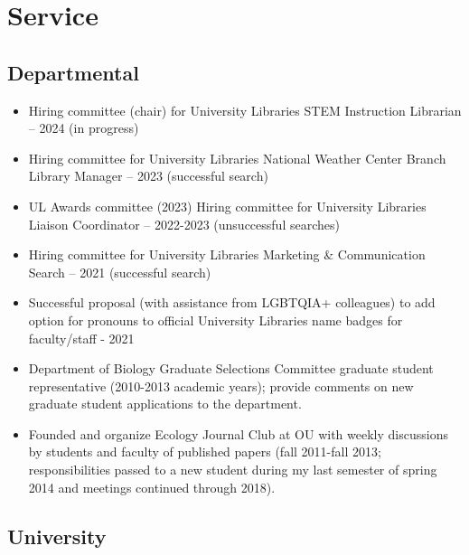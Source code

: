 \documentclass[
  letterpaper,
  DIV=11,
  numbers=noendperiod,
  oneside]{scrreprt}
\providecommand{\tightlist}{%
  \setlength{\itemsep}{0pt}\setlength{\parskip}{0pt}}\usepackage{longtable,booktabs,array}
\begin{document}

\chapter{Service}\label{service}

\section{Departmental}\label{departmental}

\begin{itemize}
\tightlist
\item
  Hiring committee (chair) for University Libraries STEM Instruction
  Librarian -- 2024 (in progress)
\item
  Hiring committee for University Libraries National Weather Center
  Branch Library Manager -- 2023 (successful search)
\item
  UL Awards committee (2023) Hiring committee for University Libraries
  Liaison Coordinator -- 2022-2023 (unsuccessful searches)
\item
  Hiring committee for University Libraries Marketing \& Communication
  Search -- 2021 (successful search)
\item
  Successful proposal (with assistance from LGBTQIA+ colleagues) to add
  option for pronouns to official University Libraries name badges for
  faculty/staff - 2021
\item
  Department of Biology Graduate Selections Committee graduate student
  representative (2010-2013 academic years); provide comments on new
  graduate student applications to the department.
\item
  Founded and organize Ecology Journal Club at OU with weekly
  discussions by students and faculty of published papers (fall
  2011-fall 2013; responsibilities passed to a new student during my
  last semester of spring 2014 and meetings continued through 2018).
\end{itemize}

\section{University}\label{university}
\end{document}
